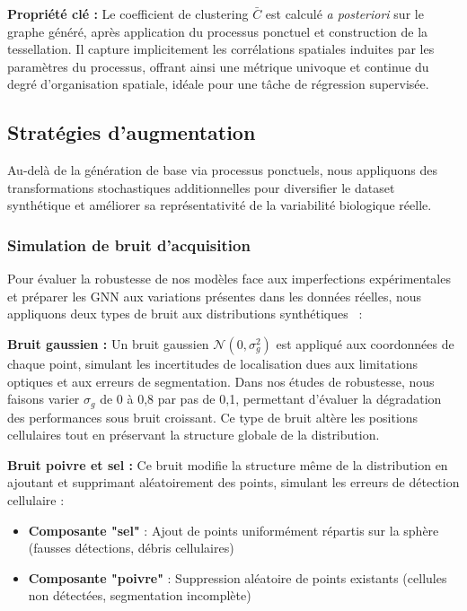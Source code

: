 \textbf{Propriété clé :} Le coefficient de clustering $\bar{C}$ est calculé \textit{a posteriori} sur le graphe généré, après application du processus ponctuel et construction de la tessellation. Il capture implicitement les corrélations spatiales induites par les paramètres du processus, offrant ainsi une métrique univoque et continue du degré d'organisation spatiale, idéale pour une tâche de régression supervisée.

\subsection{Stratégies d'augmentation}

Au-delà de la génération de base via processus ponctuels, nous appliquons des transformations stochastiques additionnelles pour diversifier le dataset synthétique et améliorer sa représentativité de la variabilité biologique réelle.

\subsubsection{Simulation de bruit d'acquisition}

Pour évaluer la robustesse de nos modèles face aux imperfections expérimentales et préparer les GNN aux variations présentes dans les données réelles, nous appliquons deux types de bruit aux distributions synthétiques~\cite{Martin2025GRETSI2} :

\textbf{Bruit gaussien :}
Un bruit gaussien $\mathcal{N}(0, \sigma_g^2)$ est appliqué aux coordonnées de chaque point, simulant les incertitudes de localisation dues aux limitations optiques et aux erreurs de segmentation. Dans nos études de robustesse, nous faisons varier $\sigma_g$ de 0 à 0,8 par pas de 0,1, permettant d'évaluer la dégradation des performances sous bruit croissant. Ce type de bruit altère les positions cellulaires tout en préservant la structure globale de la distribution.

\textbf{Bruit poivre et sel :}
Ce bruit modifie la structure même de la distribution en ajoutant et supprimant aléatoirement des points, simulant les erreurs de détection cellulaire :
\begin{itemize}
    \item \textbf{Composante "sel"} : Ajout de points uniformément répartis sur la sphère (fausses détections, débris cellulaires)
    \item \textbf{Composante "poivre"} : Suppression aléatoire de points existants (cellules non détectées, segmentation incomplète)
\end{itemize}

